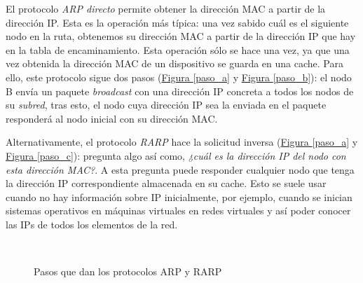 \documentclass[10pt,a4paper,spanish]{report}
\begin{document}
El protocolo \textit{\textcolor{tema4}{ARP directo}} permite obtener la dirección MAC a partir de la dirección IP. Esta es la operación más típica: una vez sabido cuál es el siguiente nodo en la ruta, obtenemos su dirección MAC a partir de la dirección IP que hay en la tabla de encaminamiento. Esta operación sólo se hace una vez, ya que una vez obtenida la dirección MAC de un dispositivo se guarda en una cache. Para ello, este protocolo sigue dos pasos (\hyperref[paso_a]{Figura \ref*{paso_a}} y \hyperref[paso_b]{Figura \ref*{paso_b}}): el nodo B envía un paquete \textit{\textcolor{tema4}{broadcast}} con una dirección IP concreta a todos los nodos de su \textit{\textcolor{tema4}{subred}}, tras esto, el nodo cuya dirección IP sea la enviada en el paquete responderá al nodo inicial con su dirección MAC.

Alternativamente, el protocolo \textit{\textcolor{tema4}{RARP}} hace la solicitud inversa (\hyperref[paso_a]{Figura \ref*{paso_a}} y \hyperref[paso_c]{Figura \ref*{paso_c}}): pregunta algo así como, \textit{\textcolor{tema4}{¿cuál es la dirección IP del nodo con esta dirección MAC?}}. A esta pregunta puede responder cualquier nodo que tenga la dirección IP correspondiente almacenada en su cache. Esto se suele usar cuando no hay información sobre IP inicialmente, por ejemplo, cuando se inician sistemas operativos en máquinas virtuales en redes virtuales y así poder conocer las IPs de todos los elementos de la red.

\begin{figure}[!h]
\centering
\mbox {
\qquad
{}
}
\caption{Pasos que dan los protocolos ARP y RARP}
\label{ARPsteps}
\end{figure}
\end{document}
